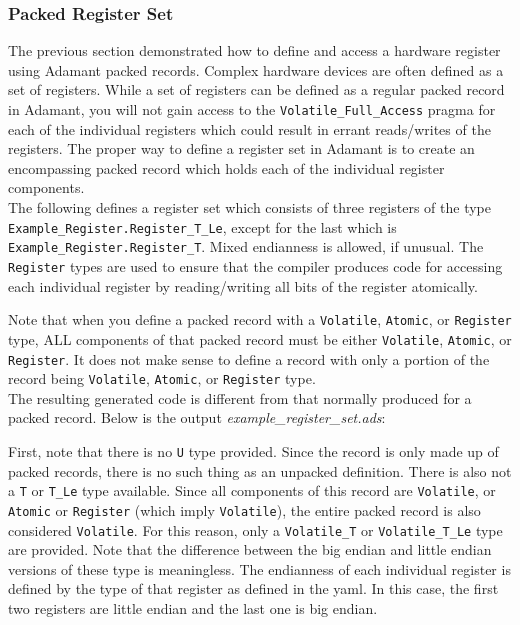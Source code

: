 \subsubsection{Packed Register Set}

The previous section demonstrated how to define and access a hardware register using Adamant packed records. Complex hardware devices are often defined as a set of registers. While a set of registers can be defined as a regular packed record in Adamant, you will not gain access to the \texttt{Volatile\_Full\_Access} pragma for each of the individual registers which could result in errant reads/writes of the registers. The proper way to define a register set in Adamant is to create an encompassing packed record which holds each of the individual register components. \\

The following defines a register set which consists of three registers of the type \texttt{Example\_Register.Register\_T\_Le}, except for the last which is \texttt{Example\_Register.Register\_T}. Mixed endianness is allowed, if unusual. The \texttt{Register} types are used to ensure that the compiler produces code for accessing each individual register by reading/writing all bits of the register atomically.


Note that when you define a packed record with a \texttt{Volatile}, \texttt{Atomic}, or \texttt{Register} type, ALL components of that packed record must be either \texttt{Volatile}, \texttt{Atomic}, or \texttt{Register}. It does not make sense to define a record with only a portion of the record being \texttt{Volatile}, \texttt{Atomic}, or \texttt{Register} type. \\

The resulting generated code is different from that normally produced for a packed record. Below is the output \textit{example\_register\_set.ads}:


First, note that there is no \texttt{U} type provided. Since the record is only made up of packed records, there is no such thing as an unpacked definition. There is also not a \texttt{T} or \texttt{T\_Le} type available. Since all components of this record are \texttt{Volatile}, or \texttt{Atomic} or \texttt{Register} (which imply \texttt{Volatile}), the entire packed record is also considered \texttt{Volatile}. For this reason, only a \texttt{Volatile\_T} or \texttt{Volatile\_T\_Le} type are provided. Note that the difference between the big endian and little endian versions of these type is meaningless. The endianness of each individual register is defined by the type of that register as defined in the yaml. In this case, the first two registers are little endian and the last one is big endian. \\

